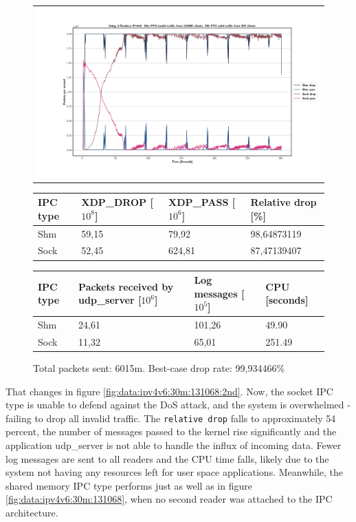 \begin{figure}[!h]
	\centering
	\scriptsize
	\begin{tabular}{c}
    	\centerline{\includegraphics[width=1.2\textwidth]{images/IPv4v6_20m_2ndReader_1.png}}
	\end{tabular}
	\begin{tabular}{llll}
		\toprule
		\textbf{IPC type} & \textbf{XDP\_DROP [$10^8$]} & \textbf{XDP\_PASS [$10^6$]} & \textbf{Relative drop [\%]} \\ \midrule 
		Shm & 59,15 & 79,92 & 98,64873119 \\
        Sock & 52,45 & 624,81 & 87,47139407 \\
	\bottomrule
	\end{tabular}
    \begin{tabular}{llll}
		\toprule
		\textbf{IPC type} & \textbf{Packets received by udp\_server [$10^6$]} & \textbf{Log messages [$10^5$]} & \textbf{CPU [seconds]} \\ \midrule 
		Shm & 24,61 & 101,26 & 49.90 \\
        Sock & 11,32 & 65,01 & 251.49 \\
	\bottomrule
	\end{tabular}
	\caption[Simplefail2ban with 2nd Reader, IPv4v6, 20m \ac{PPS}, 131068 malicious clients]{Total packets sent: 6015m. Best-case drop rate: 99,934466\%}
	\label{fig:data:ipv4v6:20m:131068:2nd}
\end{figure}

That changes in figure \ref{fig:data:ipv4v6:30m:131068:2nd}.
Now, the socket \ac{IPC} type is unable to defend against the \ac{DoS} attack, and the system is overwhelmed - failing to drop all invalid traffic.  
The \texttt{relative drop} falls to approximately 54 percent, the number of messages passed to the kernel rise significantly and the application udp\_server is not able to handle the influx of incoming data.
Fewer log messages are sent to all readers and the \ac{CPU} time falls, likely due to the system not having any resources left for user space applications.
Meanwhile, the shared memory \ac{IPC} type performs just as well as in figure \ref{fig:data:ipv4v6:30m:131068}, when no second reader was attached to the \ac{IPC} architecture.

